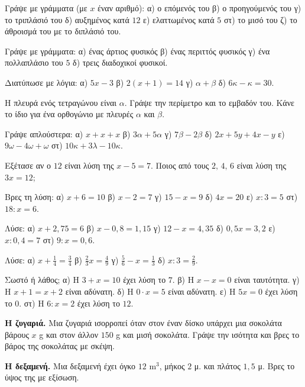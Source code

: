 

\ex Γράψε με γράμματα (με $x$ έναν αριθμό): α) ο επόμενός του \quad β) ο προηγούμενός του \quad γ) το τριπλάσιό του \quad δ) αυξημένος κατά $12$ \quad ε) ελαττωμένος κατά $5$ \quad στ) το μισό του \quad ζ) το άθροισμά του με το διπλάσιό του.

\ex Γράψε με γράμματα: α) ένας άρτιος φυσικός \quad β) ένας περιττός φυσικός \quad γ) ένα πολλαπλάσιο του $5$ \quad δ) τρεις διαδοχικοί φυσικοί.

\ex Διατύπωσε με λόγια: α) $5x-3$ \quad β) $2(x+1)=14$ \quad γ) $\alpha+\beta$ \quad δ) $6\kappa-\kappa=30$.

\ex Η πλευρά ενός τετραγώνου είναι $\alpha$. Γράψε την περίμετρο και το εμβαδόν του. Κάνε το ίδιο για ένα ορθογώνιο με πλευρές $\alpha$ και $\beta$.

\ex Γράψε απλούστερα: α) $x+x+x$ \quad β) $3\alpha+5\alpha$ \quad γ) $7\beta-2\beta$ \quad δ) $2x+5y+4x-y$ \quad ε) $9\omega-4\omega+\omega$ \quad στ) $10\kappa+3\lambda-10\kappa$.

\ex Εξέτασε αν ο $12$ είναι λύση της $x-5=7$. Ποιος από τους $2,\,4,\,6$ είναι λύση της $3x=12$;

\ex Βρες τη λύση: α) $x+6=10$ \quad β) $x-2=7$ \quad γ) $15-x=9$ \quad δ) $4x=20$ \quad ε) $x:3=5$ \quad στ) $18:x=6$.

\ex Λύσε: α) $x+2{,}75=6$ \quad β) $x-0{,}8=1{,}15$ \quad γ) $12-x=4{,}35$ \quad δ) $0{,}5x=3{,}2$ \quad ε) $x:0{,}4=7$ \quad στ) $9:x=0{,}6$.

\ex Λύσε: α) $x+\frac{1}{4}=\frac{3}{4}$ \quad β) $\frac{2}{3}x=\frac{4}{9}$ \quad γ) $\frac{5}{6}-x=\frac{1}{3}$ \quad δ) $x:3=\frac{2}{9}$.

\ex Σωστό ή λάθος; α) Η $3+x=10$ έχει λύση το $7$. \quad β) Η $x-x=0$ είναι ταυτότητα. \quad γ) Η $x+1=x+2$ είναι αδύνατη. \quad δ) Η $0\cdot x=5$ είναι αδύνατη. \quad ε) Η $5x=0$ έχει λύση το $0$. \quad στ) Η $6:x=2$ έχει λύση το $12$.


\ex \textbf{Η ζυγαριά.} Μια ζυγαριά ισορροπεί όταν στον έναν δίσκο υπάρχει μια σοκολάτα βάρους $x$ g και στον άλλον $150$ g και μισή σοκολάτα. Γράψε την ισότητα και βρες το βάρος της σοκολάτας με σκέψη.

\ex \textbf{Η δεξαμενή.} Μια δεξαμενή έχει όγκο $12$ m$^3$, μήκος $2$ μ. και πλάτος $1{,}5$ μ. Βρες το ύψος της με εξίσωση.

